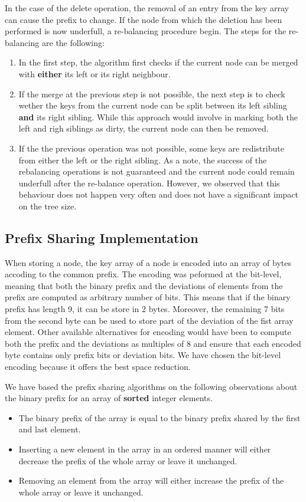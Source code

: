 \documentclass[11pt,a4paper,oneside]{article}
\begin{document}
In the case of the delete operation, the removal of an entry from the key array can cause the prefix to change. If the node from which the deletion has been performed is now underfull, a re-balancing procedure begin. The steps for the re-balancing are the following:
\begin{enumerate}
	\item In the first step, the algorithm first checks if the current node can be merged with \textbf{either} its left or its right neighbour. 
	\item If the merge at the previous step is not possible, the next step is to check wether the keys from the current node can be split between its left sibling \textbf{and} its right sibling. While this approach would involve in marking both the left and righ siblings as dirty, the current node can then be removed.
	\item If the the previous operation was not possible, some keys are redistribute from either the left or the right sibling. As a note, the success of the rebalancing operations is not guaranteed and the current node could remain underfull after the re-balance operation. However, we observed that this behaviour does not happen very often and does not have a significant impact on the tree size.
\end{enumerate}


\subsection{Prefix Sharing Implementation} %
\label{sub:prefix_sharing_rebalancing}
When storing a node, the key array of a node is encoded into an array of bytes accoding to the common prefix. The encoding was peformed at the bit-level, meaning that both the binary prefix and the deviations of elements from the prefix are computed as arbitrary number of bits. This means that if the binary prefix has length 9, it can be store in 2 bytes. Moreover, the remaining 7 bits from the second byte can be used to store part of the deviation of the fist array element. Other available alternatives for encoding would have been to compute both the prefix and the deviations as multiples of 8 and ensure that each encoded byte contains only prefix bits or deviation bits. We have chosen the bit-level encoding because it offers the best space reduction.

We have based the prefix sharing algorithms on the following observations about the binary prefix for an array of \textbf{sorted} integer elements.
\begin{itemize}
	\item The binary prefix of the array is equal to the binary prefix shared by the first and last element.
	\item Inserting a new element in the array in an ordered manner will either decrease the prefix of the whole array or leave it unchanged.
	\item Removing an element from the array will either increase the prefix of the whole array or leave it unchanged.
\end{itemize}
\end{document}
